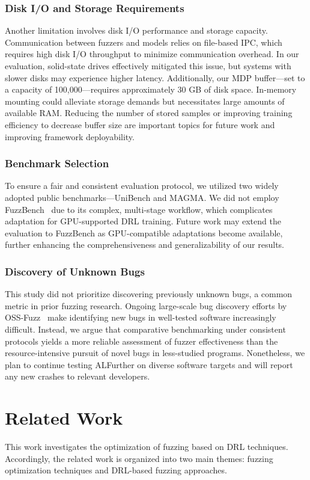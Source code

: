 \documentclass[lettersize,journal]{IEEEtran}
\begin{document}
\subsubsection{Disk I/O and Storage Requirements}
Another limitation involves disk I/O performance and storage capacity. Communication between fuzzers and models relies on file-based IPC, which requires high disk I/O throughput to minimize communication overhead. In our evaluation, solid-state drives effectively mitigated this issue, but systems with slower disks may experience higher latency. Additionally, our MDP buffer—set to a capacity of 100,000—requires approximately 30 GB of disk space. In-memory mounting could alleviate storage demands but necessitates large amounts of available RAM. Reducing the number of stored samples or improving training efficiency to decrease buffer size are important topics for future work and improving framework deployability.

\subsubsection{Benchmark Selection}
To ensure a fair and consistent evaluation protocol, we utilized two widely adopted public benchmarks—UniBench and MAGMA. We did not employ FuzzBench~\cite{metzmanFuzzBenchOpenFuzzer2021} due to its complex, multi-stage workflow, which complicates adaptation for GPU-supported DRL training. Future work may extend the evaluation to FuzzBench as GPU-compatible adaptations become available, further enhancing the comprehensiveness and generalizability of our results.

\subsubsection{Discovery of Unknown Bugs}
This study did not prioritize discovering previously unknown bugs, a common metric in prior fuzzing research. Ongoing large-scale bug discovery efforts by OSS-Fuzz~\cite{aryaOSSfuzz2025} make identifying new bugs in well-tested software increasingly difficult. Instead, we argue that comparative benchmarking under consistent protocols yields a more reliable assessment of fuzzer effectiveness than the resource-intensive pursuit of novel bugs in less-studied programs. Nonetheless, we plan to continue testing ALFurther on diverse software targets and will report any new crashes to relevant developers.


\section{Related Work}\label{sec:related_work}
This work investigates the optimization of fuzzing based on DRL techniques. Accordingly, the related work is organized into two main themes: fuzzing optimization techniques and DRL-based fuzzing approaches.
\end{document}
